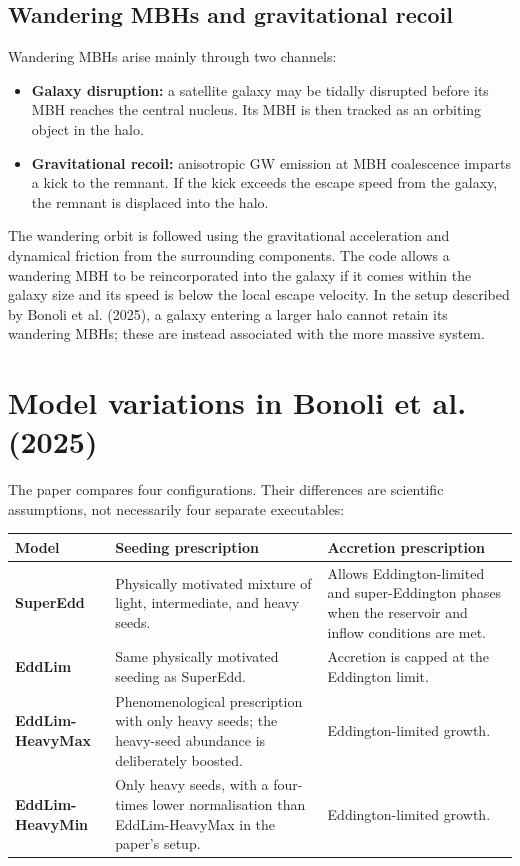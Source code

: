 \documentclass[11pt,a4paper]{article}
\begin{document}
\subsection{Wandering MBHs and gravitational recoil}

Wandering MBHs arise mainly through two channels:
\begin{itemize}
  \item \textbf{Galaxy disruption:} a satellite galaxy may be tidally disrupted before its MBH reaches the central nucleus. Its MBH is then tracked as an orbiting object in the halo.
  \item \textbf{Gravitational recoil:} anisotropic GW emission at MBH coalescence imparts a kick to the remnant. If the kick exceeds the escape speed from the galaxy, the remnant is displaced into the halo.
\end{itemize}

The wandering orbit is followed using the gravitational acceleration and dynamical friction from the surrounding components. The code allows a wandering MBH to be reincorporated into the galaxy if it comes within the galaxy size and its speed is below the local escape velocity. In the setup described by Bonoli et al. (2025), a galaxy entering a larger halo cannot retain its wandering MBHs; these are instead associated with the more massive system.

\section{Model variations in Bonoli et al. (2025)}

The paper compares four configurations. Their differences are scientific assumptions, not necessarily four separate executables:

\begin{longtable}{>{\raggedright\arraybackslash}p{3.1cm}>{\raggedright\arraybackslash}p{5.1cm}>{\raggedright\arraybackslash}p{6.0cm}}
\toprule
\textbf{Model} & \textbf{Seeding prescription} & \textbf{Accretion prescription} \\
\midrule
\endhead
\textbf{SuperEdd} & Physically motivated mixture of light, intermediate, and heavy seeds. & Allows Eddington-limited and super-Eddington phases when the reservoir and inflow conditions are met. \\
\textbf{EddLim} & Same physically motivated seeding as SuperEdd. & Accretion is capped at the Eddington limit. \\
\textbf{EddLim-HeavyMax} & Phenomenological prescription with only heavy seeds; the heavy-seed abundance is deliberately boosted. & Eddington-limited growth. \\
\textbf{EddLim-HeavyMin} & Only heavy seeds, with a four-times lower normalisation than EddLim-HeavyMax in the paper's setup. & Eddington-limited growth. \\
\bottomrule
\end{longtable}
\end{document}
